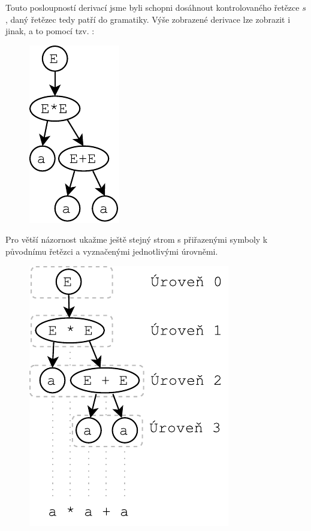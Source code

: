 \noindent
Touto posloupností derivací jsme byli schopni dosáhnout kontrolovaného řetězce $s$,
daný řetězec tedy patří do gramatiky. Výše zobrazené derivace lze zobrazit
i jinak, a to pomocí tzv. :

\begin{figure}[H]
  \centering
  \includegraphics{fig/Derivations1.pdf}
\end{figure}

\noindent
Pro větší názornost ukažme ještě stejný strom s přiřazenými symboly k původnímu
řetězci a vyznačenými jednotlivými úrovněmi.

\begin{figure}[H]
  \centering
  \includegraphics{fig/Derivations2.pdf}
\end{figure}

